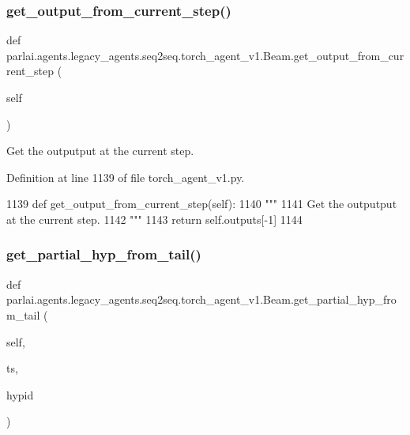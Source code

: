 \subsubsection{\texorpdfstring{get\+\_\+output\+\_\+from\+\_\+current\+\_\+step()}{get\_output\_from\_current\_step()}}
{\footnotesize\ttfamily def parlai.\+agents.\+legacy\+\_\+agents.\+seq2seq.\+torch\+\_\+agent\+\_\+v1.\+Beam.\+get\+\_\+output\+\_\+from\+\_\+current\+\_\+step (\begin{DoxyParamCaption}\item[{}]{self }\end{DoxyParamCaption})}

\begin{DoxyVerb}Get the outputput at the current step.
\end{DoxyVerb}
 

Definition at line 1139 of file torch\+\_\+agent\+\_\+v1.\+py.


\begin{DoxyCode}
1139     \textcolor{keyword}{def }get\_output\_from\_current\_step(self):
1140         \textcolor{stringliteral}{"""}
1141 \textcolor{stringliteral}{        Get the outputput at the current step.}
1142 \textcolor{stringliteral}{        """}
1143         \textcolor{keywordflow}{return} self.outputs[-1]
1144 
\end{DoxyCode}
\mbox{\label{classparlai_1_1agents_1_1legacy__agents_1_1seq2seq_1_1torch__agent__v1_1_1Beam_a94a3638f18c959a5a9223061ea9af77e}} 
\subsubsection{\texorpdfstring{get\+\_\+partial\+\_\+hyp\+\_\+from\+\_\+tail()}{get\_partial\_hyp\_from\_tail()}}
{\footnotesize\ttfamily def parlai.\+agents.\+legacy\+\_\+agents.\+seq2seq.\+torch\+\_\+agent\+\_\+v1.\+Beam.\+get\+\_\+partial\+\_\+hyp\+\_\+from\+\_\+tail (\begin{DoxyParamCaption}\item[{}]{self,  }\item[{}]{ts,  }\item[{}]{hypid }\end{DoxyParamCaption})}



